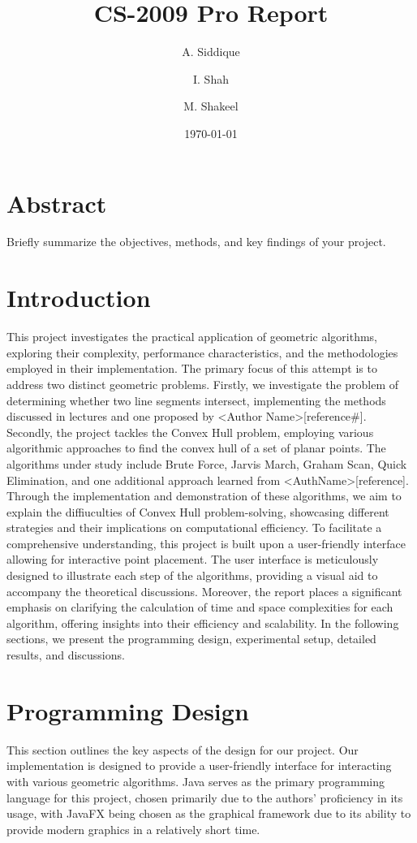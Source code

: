 \documentclass[10pt,twocolumn]{article}
\title{CS-2009 Pro Report}
\author{A. Siddique \and I. Shah \and M. Shakeel}
\date{\today}
\begin{document}
\maketitle

\section*{Abstract}
Briefly summarize the objectives, methods, and key findings of your project.

\section*{Introduction}
This project investigates the practical application of geometric algorithms,
exploring their complexity, performance characteristics, and the methodologies employed in their implementation.
The primary focus of this attempt is to address two distinct geometric problems. Firstly, we investigate the problem of
determining whether two line segments intersect, implementing the methods discussed in lectures and one proposed by <Author Name>[reference#].
Secondly, the project tackles the Convex Hull problem, employing various algorithmic approaches to find the convex hull of a set
of planar points. The algorithms under study include Brute Force, Jarvis March, Graham Scan, Quick Elimination, and one
additional approach learned from <AuthName>[reference]. Through the implementation and demonstration of these algorithms, we
aim to explain the diffiuculties of Convex Hull problem-solving, showcasing different strategies and their implications on computational efficiency.
To facilitate a comprehensive understanding, this project is built upon a user-friendly interface allowing for interactive point
placement. The user interface is meticulously designed to illustrate each step of the algorithms,
providing a visual aid to accompany the theoretical discussions. Moreover, the report places a significant emphasis on clarifying
the calculation of time and space complexities for each algorithm, offering insights into their efficiency and scalability.
In the following sections, we present the programming design, experimental setup, detailed results, and discussions.

\section*{Programming Design}

This section outlines the key aspects of the design for our project. Our implementation is designed to provide a user-friendly interface for 
interacting with various geometric algorithms. Java serves as the primary programming language for this project, 
chosen primarily due to the authors' proficiency in its usage, with JavaFX being chosen as the graphical framework due to its ability to provide
modern graphics in a relatively short time.
\end{document}
